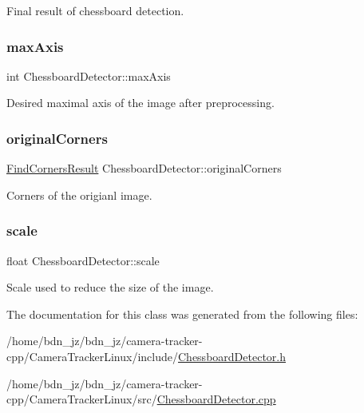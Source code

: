 Final result of chessboard detection. \mbox{\label{class_chessboard_detector_a5d5dc8aaf92fb5ed7e73892ad678ec96}} 
\subsubsection{\texorpdfstring{max\+Axis}{maxAxis}}
{\footnotesize\ttfamily int Chessboard\+Detector\+::max\+Axis\hspace{0.3cm}{\ttfamily [private]}}

Desired maximal axis of the image after preprocessing. \mbox{\label{class_chessboard_detector_a726c92a071aa8c46d67f33c7a0760d54}} 
\subsubsection{\texorpdfstring{original\+Corners}{originalCorners}}
{\footnotesize\ttfamily \hyperlink{struct_find_corners_result}{Find\+Corners\+Result} Chessboard\+Detector\+::original\+Corners\hspace{0.3cm}{\ttfamily [private]}}

Corners of the origianl image. \mbox{\label{class_chessboard_detector_ac5594a662e5f276b5f0e5450b883efa0}} 
\subsubsection{\texorpdfstring{scale}{scale}}
{\footnotesize\ttfamily float Chessboard\+Detector\+::scale\hspace{0.3cm}{\ttfamily [private]}}

Scale used to reduce the size of the image. 

The documentation for this class was generated from the following files\+:\begin{DoxyCompactItemize}
\item 
/home/bdn\+\_\+jz/bdn\+\_\+jz/camera-\/tracker-\/cpp/\+Camera\+Tracker\+Linux/include/\hyperlink{_chessboard_detector_8h}{Chessboard\+Detector.\+h}\item 
/home/bdn\+\_\+jz/bdn\+\_\+jz/camera-\/tracker-\/cpp/\+Camera\+Tracker\+Linux/src/\hyperlink{_chessboard_detector_8cpp}{Chessboard\+Detector.\+cpp}\end{DoxyCompactItemize}
